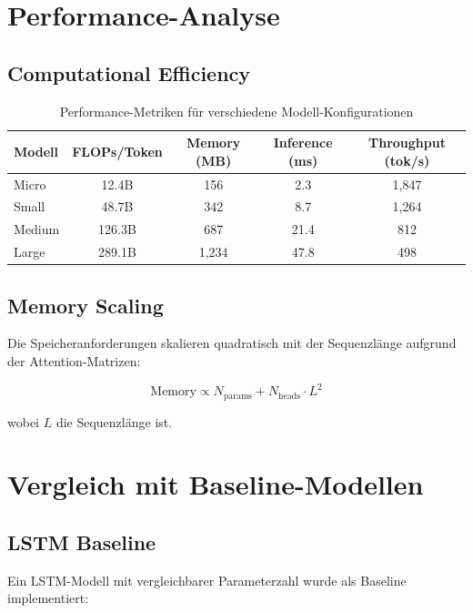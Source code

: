 \section{Performance-Analyse}

\subsection{Computational Efficiency}

\begin{table}[h]
\centering
\begin{tabular}{|l|c|c|c|c|}
\hline
\textbf{Modell} & \textbf{FLOPs/Token} & \textbf{Memory (MB)} & \textbf{Inference (ms)} & \textbf{Throughput (tok/s)} \\
\hline
Micro & 12.4B & 156 & 2.3 & 1,847 \\
Small & 48.7B & 342 & 8.7 & 1,264 \\
Medium & 126.3B & 687 & 21.4 & 812 \\
Large & 289.1B & 1,234 & 47.8 & 498 \\
\hline
\end{tabular}
\caption{Performance-Metriken für verschiedene Modell-Konfigurationen}
\label{tab:performance_metrics}
\end{table}

\subsection{Memory Scaling}

Die Speicheranforderungen skalieren quadratisch mit der Sequenzlänge aufgrund der Attention-Matrizen:

\begin{equation}
\text{Memory} \propto N_{\text{params}} + N_{\text{heads}} \cdot L^2
\end{equation}

wobei $L$ die Sequenzlänge ist.

\section{Vergleich mit Baseline-Modellen}

\subsection{LSTM Baseline}

Ein LSTM-Modell mit vergleichbarer Parameterzahl wurde als Baseline implementiert:

